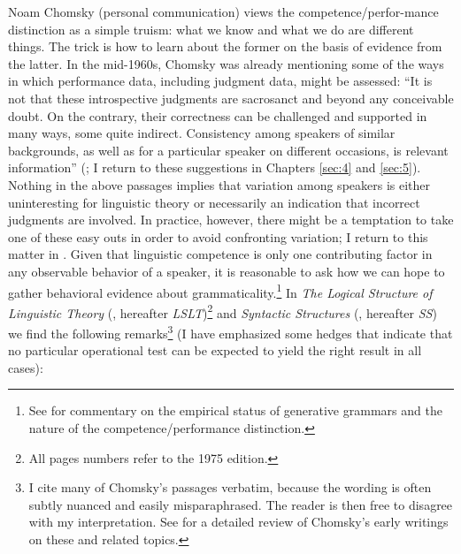 Noam Chomsky (personal communication) views the competence\slash perfor-\linebreak mance distinction as a simple truism: what we know and what we do are different things. The trick is how to learn about the former on the basis of evidence from the latter. In the mid-1960s, Chomsky was already mentioning some of the ways in which performance data, including judgment data, might be assessed: ``It is not that these introspective judgments are sacrosanct and beyond any conceivable doubt. On the contrary, their correctness can be challenged and supported in many ways, some quite indirect. Consistency among speakers of similar backgrounds, as well as for a particular speaker on different occasions, is relevant information'' (\citet[56]{Chomsky1964}; I return to these suggestions in Chapters \ref{sec:4} and \ref{sec:5}). Nothing in the above passages implies that variation among speakers is either uninteresting for linguistic theory or necessarily an indication that incorrect judgments are involved. In practice, however, there might be a temptation to take one of these easy outs in order to avoid confronting variation; I return to this matter in . Given that linguistic competence is only one contributing factor in any observable behavior of a speaker, it is reasonable to ask how we can hope to gather behavioral evidence about grammaticality.\footnote{See  \citet{OllerEtAl1970} for commentary on the empirical status of generative grammars and the nature of the competence/performance distinction.}
 In \textit{The Logical Structure of Linguistic Theory} (\citet{Chomsky1975}, hereafter \textit{LSLT})\footnote{All pages numbers refer to the 1975 edition.} and \textit{Syntactic Structures}
(\citet{Chomsky1957}, hereafter \textit{SS}) we find the following remarks\footnote{I cite many of Chomsky's passages verbatim, because the wording is often subtly nuanced and easily misparaphrased. The reader is then free to disagree with my interpretation. See \citet[ch. 4]{Matthews1993} for a detailed review of Chomsky's early writings on these and related topics.
}
 (I have emphasized some hedges that indicate that no particular operational  test can be expected to yield the right result in all cases):

